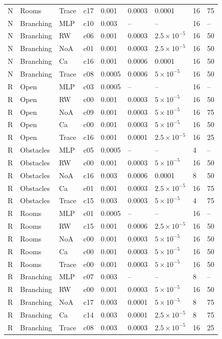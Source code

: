 \begin{longtable}{@{}lllllllll@{}}
N & Rooms & Trace & c17 & 0.001 & 0.0003 & 0.0001 & 16 & 75\\
N & Branching & MLP & c10 & 0.003 & -- & -- & 16 & --\\
N & Branching & RW & c06 & 0.001 & 0.0003 & $2.5\!\times10^{-5}$ & 16 & 50\\
N & Branching & NoA & c01 & 0.001 & 0.0003 & $2.5\!\times10^{-5}$ & 16 & 50\\
N & Branching & Ca & c16 & 0.001 & 0.0006 & 0.0001 & 16 & 50\\
N & Branching & Trace & c08 & 0.0005 & 0.0006 & $5\!\times10^{-5}$ & 16 & 50\\
R & Open & MLP & c03 & 0.0005 & -- & -- & 16 & --\\
R & Open & RW & c00 & 0.001 & 0.0003 & $5\!\times10^{-5}$ & 16 & 50\\
R & Open & NoA & c09 & 0.001 & 0.0003 & $5\!\times10^{-5}$ & 16 & 75\\
R & Open & Ca & c00 & 0.001 & 0.0003 & $5\!\times10^{-5}$ & 16 & 50\\
R & Open & Trace & c16 & 0.001 & 0.0001 & $2.5\!\times10^{-5}$ & 16 & 25\\
R & Obstacles & MLP & c05 & 0.0005 & -- & -- & 4 & --\\
R & Obstacles & RW & c00 & 0.001 & 0.0003 & $5\!\times10^{-5}$ & 16 & 50\\
R & Obstacles & NoA & c16 & 0.003 & 0.0006 & 0.0001 & 8 & 50\\
R & Obstacles & Ca & c01 & 0.001 & 0.0003 & $2.5\!\times10^{-5}$ & 16 & 75\\
R & Obstacles & Trace & c15 & 0.003 & 0.0003 & $5\!\times10^{-5}$ & 4 & 75\\
R & Rooms & MLP & c01 & 0.0005 & -- & -- & 16 & --\\
R & Rooms & RW & c15 & 0.001 & 0.0006 & $2.5\!\times10^{-5}$ & 16 & 50\\
R & Rooms & NoA & c00 & 0.001 & 0.0003 & $5\!\times10^{-5}$ & 16 & 50\\
R & Rooms & Ca & c00 & 0.001 & 0.0003 & $5\!\times10^{-5}$ & 16 & 50\\
R & Rooms & Trace & c00 & 0.001 & 0.0003 & $5\!\times10^{-5}$ & 16 & 50\\
R & Branching & MLP & c07 & 0.003 & -- & -- & 8 & --\\
R & Branching & RW & c00 & 0.001 & 0.0003 & $5\!\times10^{-5}$ & 16 & 50\\
R & Branching & NoA & c17 & 0.003 & 0.0001 & $5\!\times10^{-5}$ & 8 & 75\\
R & Branching & Ca & c14 & 0.003 & 0.0001 & $2.5\!\times10^{-5}$ & 8 & 75\\
R & Branching & Trace & c08 & 0.003 & 0.0003 & $2.5\!\times10^{-5}$ & 16 & 25\\
\end{longtable}\endgroup
